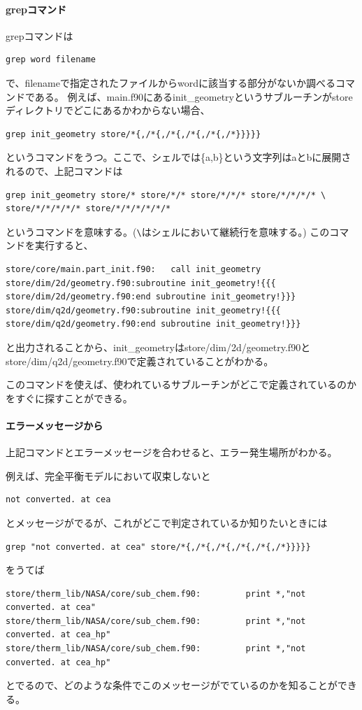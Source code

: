 \documentclass{jsarticle}
\begin{document}
\paragraph{grepコマンド}%
grepコマンドは
\begin{verbatim}
grep word filename
\end{verbatim}
で、filenameで指定されたファイルからwordに該当する部分がないか調べるコマンドである。
例えば、main.f90にあるinit\_geometryというサブルーチンがstoreディレクトリでどこにあるかわからない場合、
\begin{verbatim}
grep init_geometry store/*{,/*{,/*{,/*{,/*{,/*}}}}}
\end{verbatim}
というコマンドをうつ。ここで、シェルでは\{a,b\}という文字列はaとbに展開されるので、上記コマンドは
\begin{verbatim}
grep init_geometry store/* store/*/* store/*/*/* store/*/*/*/* \
store/*/*/*/*/* store/*/*/*/*/*/*
\end{verbatim}
というコマンドを意味する。(\verb|\|はシェルにおいて継続行を意味する。)
このコマンドを実行すると、
\begin{verbatim}
store/core/main.part_init.f90:   call init_geometry
store/dim/2d/geometry.f90:subroutine init_geometry!{{{
store/dim/2d/geometry.f90:end subroutine init_geometry!}}}
store/dim/q2d/geometry.f90:subroutine init_geometry!{{{
store/dim/q2d/geometry.f90:end subroutine init_geometry!}}}
\end{verbatim}
と出力されることから、init\_geometryはstore/dim/2d/geometry.f90とstore/dim/q2d/geometry.f90で定義されていることがわかる。

このコマンドを使えば、使われているサブルーチンがどこで定義されているのかをすぐに探すことができる。

\paragraph{エラーメッセージから}%
上記コマンドとエラーメッセージを合わせると、エラー発生場所がわかる。

例えば、完全平衡モデルにおいて収束しないと
\begin{verbatim}
not converted. at cea
\end{verbatim}
とメッセージがでるが、これがどこで判定されているか知りたいときには
\begin{verbatim}
grep "not converted. at cea" store/*{,/*{,/*{,/*{,/*{,/*}}}}}
\end{verbatim}
をうてば
\begin{verbatim}
store/therm_lib/NASA/core/sub_chem.f90:         print *,"not converted. at cea"
store/therm_lib/NASA/core/sub_chem.f90:         print *,"not converted. at cea_hp"
store/therm_lib/NASA/core/sub_chem.f90:         print *,"not converted. at cea_hp"
\end{verbatim}
とでるので、どのような条件でこのメッセージがでているのかを知ることができる。
\end{document}

